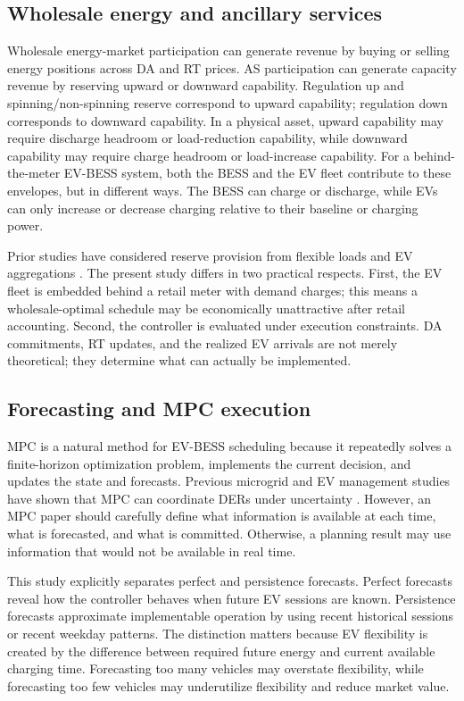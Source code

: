 \documentclass[final,5p,times]{elsarticle}
\begin{document}
\subsection{Wholesale energy and ancillary services}
Wholesale energy-market participation can generate revenue by buying or selling energy positions across DA and RT prices. AS participation can generate capacity revenue by reserving upward or downward capability. Regulation up and spinning/non-spinning reserve correspond to upward capability; regulation down corresponds to downward capability. In a physical asset, upward capability may require discharge headroom or load-reduction capability, while downward capability may require charge headroom or load-increase capability. For a behind-the-meter EV-BESS system, both the BESS and the EV fleet contribute to these envelopes, but in different ways. The BESS can charge or discharge, while EVs can only increase or decrease charging relative to their baseline or charging power.

Prior studies have considered reserve provision from flexible loads and EV aggregations \cite{thrane2024reserve}. The present study differs in two practical respects. First, the EV fleet is embedded behind a retail meter with demand charges; this means a wholesale-optimal schedule may be economically unattractive after retail accounting. Second, the controller is evaluated under execution constraints. DA commitments, RT updates, and the realized EV arrivals are not merely theoretical; they determine what can actually be implemented.

\subsection{Forecasting and MPC execution}
MPC is a natural method for EV-BESS scheduling because it repeatedly solves a finite-horizon optimization problem, implements the current decision, and updates the state and forecasts. Previous microgrid and EV management studies have shown that MPC can coordinate DERs under uncertainty \cite{parisio2014model,wang2018predictive,li2021learning}. However, an MPC paper should carefully define what information is available at each time, what is forecasted, and what is committed. Otherwise, a planning result may use information that would not be available in real time.

This study explicitly separates perfect and persistence forecasts. Perfect forecasts reveal how the controller behaves when future EV sessions are known. Persistence forecasts approximate implementable operation by using recent historical sessions or recent weekday patterns. The distinction matters because EV flexibility is created by the difference between required future energy and current available charging time. Forecasting too many vehicles may overstate flexibility, while forecasting too few vehicles may underutilize flexibility and reduce market value.
\end{document}
